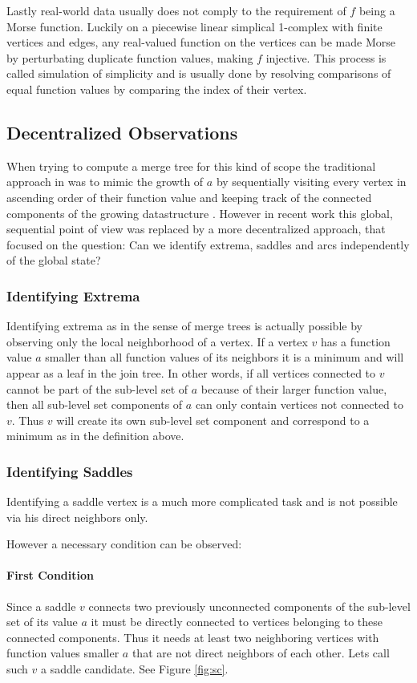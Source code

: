 \documentclass{scrartcl}
\begin{document}
Lastly real-world data usually does not comply to the requirement of \(f\) being a Morse function. Luckily on a piecewise linear simplical 1-complex with finite vertices and edges, any real-valued function on the vertices can be made Morse by perturbating duplicate function values, making \(f\) injective. This process is called simulation of simplicity and is usually done by resolving comparisons of equal function values by comparing the index of their vertex.

\subsection{Decentralized Observations}
When trying to compute a merge tree for this kind of scope the traditional approach in \cite{orig} was to mimic the growth of \(a\) by sequentially visiting every vertex in ascending order of their function value and keeping track of the connected components of the growing datastructure \cite{pascucci1}. However in recent work this global, sequential point of view was replaced by a more decentralized approach, that focused on the question: Can we identify extrema, saddles and arcs independently of the global state? 

\subsubsection{Identifying Extrema}
Identifying extrema as in the sense of merge trees is actually possible by observing only the local neighborhood of a vertex. If a vertex \(v\) has a function value \(a\) smaller than all function values of its neighbors it is a minimum and will appear as a leaf in the join tree. In other words, if all vertices connected to \(v\) cannot be part of the sub-level set of \(a\) because of their larger function value, then all sub-level set components of \(a\) can only contain vertices not connected to \(v\). Thus \(v\) will create its own sub-level set component and correspond to a minimum as in the definition above.

\subsubsection{Identifying Saddles}
Identifying a saddle vertex is a much more complicated task and is not possible via his direct neighbors only. 

However a necessary condition can be observed: 

\paragraph{First Condition} Since a saddle \(v\) connects two previously unconnected components of the sub-level set of its value \(a\) it must be directly connected to vertices belonging to these connected components. Thus it needs at least two neighboring vertices with function values smaller \(a\) that are not direct neighbors of each other. Lets call such \(v\) a saddle candidate. See Figure \ref{fig:sc}.
\end{document}
